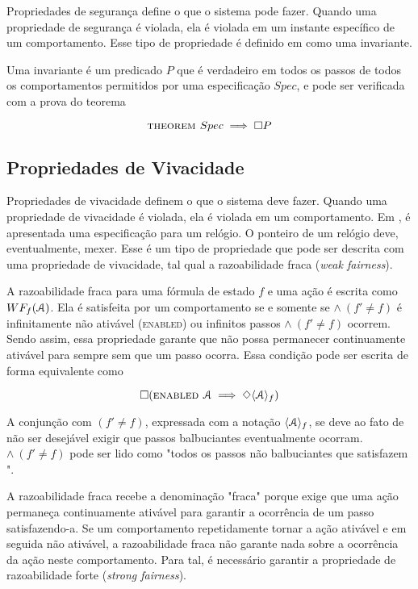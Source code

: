 Propriedades de segurança define o que o sistema pode fazer. Quando uma propriedade de segurança é violada, ela é violada em um instante específico de um comportamento. Esse tipo de propriedade é definido em \TLA como uma invariante.

Uma invariante é um predicado $P$ que é verdadeiro em todos os passos de todos os comportamentos permitidos por uma especificação $Spec$, e pode ser verificada com a prova do teorema

\[\textsc{theorem } Spec \implies \square P\]

\subsection{Propriedades de Vivacidade}

Propriedades de vivacidade definem o que o sistema deve fazer. Quando uma propriedade de vivacidade é violada, ela é violada em um comportamento. Em \cite{specifying-systems}, é apresentada uma especificação para um relógio. O ponteiro de um relógio deve, eventualmente, mexer. Esse é um tipo de propriedade que pode ser descrita com uma propriedade de vivacidade, tal qual a razoabilidade fraca (\textit{weak fairness}).

A razoabilidade fraca para uma fórmula de estado $f$ e uma ação \FANCYA é escrita como $WF_f (\textbf{$\mathcal{A}$})$. Ela é satisfeita por um comportamento se e somente se \FANCYA $\land\ (f' \neq f)$ é infinitamente não ativável (\textsc{enabled}) ou infinitos passos \FANCYA $\land\ (f' \neq f)$ ocorrem. Sendo assim, essa propriedade garante que \FANCYA não possa permanecer continuamente ativável para sempre sem que um passo \FANCYA ocorra. Essa condição pode ser escrita de forma equivalente como

\[\square (\textsc{enabled } \textbf{$\mathcal{A}$} \implies \Diamond\langle\textbf{$\mathcal{A}$}\rangle_f)\]

A conjunção com $(f' \neq f)$, expressada com a notação $\langle\textbf{$\mathcal{A}$}\rangle_f$, se deve ao fato de não ser desejável exigir que passos balbuciantes eventualmente ocorram. \FANCYA $\land\ (f' \neq f)$ pode ser lido como "todos os passos não balbuciantes que satisfazem \FANCYA".

A razoabilidade fraca recebe a denominação "fraca" porque exige que uma ação permaneça continuamente ativável para garantir a ocorrência de um passo satisfazendo-a. Se um comportamento repetidamente tornar a ação ativável e em seguida não ativável, a razoabilidade fraca não garante nada sobre a ocorrência da ação neste comportamento. Para tal, é necessário garantir a propriedade de razoabilidade forte (\textit{strong fairness}).

